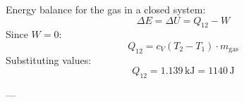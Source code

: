 Energy balance for the gas in a closed system:  
\[
\Delta E = \Delta U = Q_{12} - W
\]  
Since \( W = 0 \):  
\[
Q_{12} = c_V (T_2 - T_1) \cdot m_{\text{gas}}
\]  
Substituting values:  
\[
Q_{12} = 1.139 \, \text{kJ} = 1140 \, \text{J}
\]  

---